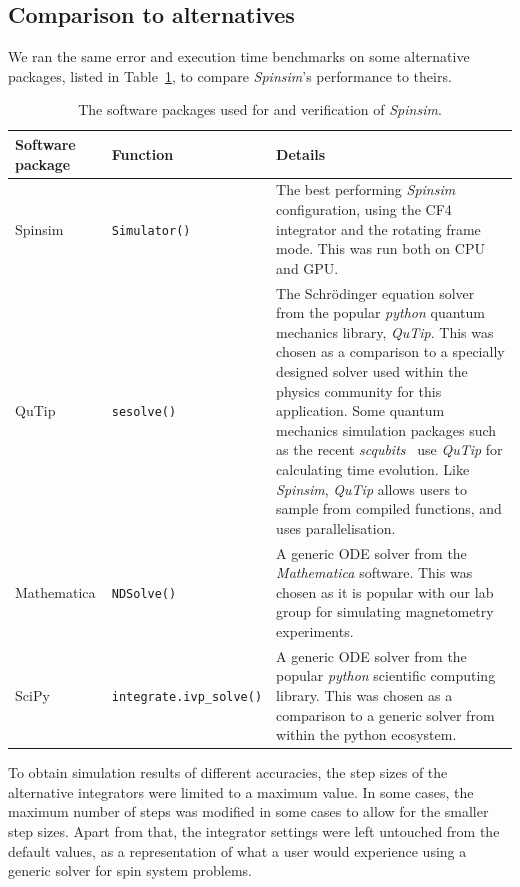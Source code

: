 \documentclass{jors}
\begin{document}
	\subsection{Comparison to alternatives}
		We ran the same error and execution time benchmarks on some alternative packages, listed in Table~\ref{tab:external}, to compare \emph{Spinsim}'s performance to theirs.
		\begin{table}[h!]
			\caption{The software packages used for and verification of \emph{Spinsim}.}
			\label{tab:external}
			\begin{tabular}{l|l|p{6.5cm}}
				\textbf{Software package}								&\textbf{Function}					&\textbf{Details}\\
				\hline
				Spinsim													&\texttt{Simulator()}				&The best performing \emph{Spinsim} configuration, using the CF4 integrator and the rotating frame mode. This was run both on CPU and GPU.
				\\
				\hline
				QuTip\cite{johansson_qutip_2013}						&\texttt{sesolve()}					&The Schr\"odinger equation solver from the popular \emph{python} quantum mechanics library, \emph{QuTip}.
				This was chosen as a comparison to a specially designed solver used within the physics community for this application.
				Some quantum mechanics simulation packages such as the recent \emph{scqubits}~\cite{groszkowski_scqubits_2021} use \emph{QuTip} for calculating time evolution.
				Like \emph{Spinsim}, \emph{QuTip} allows users to sample from compiled functions, and uses parallelisation.\\
				\hline
				Mathematica\cite{wolfram_research_inc_mathematica_2020}	&\texttt{NDSolve()}					&A generic ODE solver from the \emph{Mathematica} software.
				This was chosen as it is popular with our lab group for simulating magnetometry experiments.\\
				\hline
				SciPy\cite{virtanen_scipy_2020}							&\texttt{integrate.ivp\_solve()}	&A generic ODE solver from the popular \emph{python} scientific computing library.
				This was chosen as a comparison to a generic solver from within the python ecosystem.
			\end{tabular}
		\end{table}
		To obtain simulation results of different accuracies, the step sizes of the alternative integrators were limited to a maximum value.
		In some cases, the maximum number of steps was modified in some cases to allow for the smaller step sizes.
		Apart from that, the integrator settings were left untouched from the default values, as a representation of what a user would experience using a generic solver for spin system problems.
\end{document}
